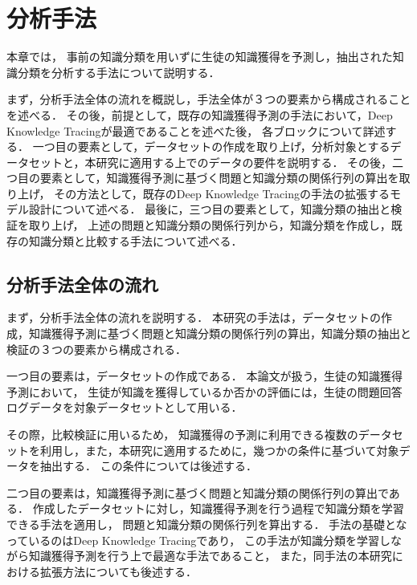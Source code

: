 \chapter{分析手法}
\label{chap:method}
\fancyhf{}
\rhead{\thepage}
\cfoot{\thepage}
本章では，
事前の知識分類を用いずに生徒の知識獲得を予測し，抽出された知識分類を分析する手法について説明する．

まず，分析手法全体の流れを概説し，手法全体が３つの要素から構成されることを述べる．
その後，前提として，既存の知識獲得予測の手法において，Deep Knowledge Tracingが最適であることを述べた後，
各ブロックについて詳述する．
一つ目の要素として，データセットの作成を取り上げ，分析対象とするデータセットと，本研究に適用する上でのデータの要件を説明する．
その後，二つ目の要素として，知識獲得予測に基づく問題と知識分類の関係行列の算出を取り上げ，
その方法として，既存のDeep Knowledge Tracingの手法の拡張するモデル設計について述べる．
最後に，三つ目の要素として，知識分類の抽出と検証を取り上げ，
上述の問題と知識分類の関係行列から，知識分類を作成し，既存の知識分類と比較する手法について述べる．


\vvspace


\section{分析手法全体の流れ}
まず，分析手法全体の流れを説明する．
本研究の手法は，データセットの作成，知識獲得予測に基づく問題と知識分類の関係行列の算出，知識分類の抽出と検証の３つの要素から構成される．


一つ目の要素は，データセットの作成である．
本論文が扱う，生徒の知識獲得予測において，
生徒が知識を獲得しているか否かの評価には，生徒の問題回答ログデータを対象データセットとして用いる．

その際，比較検証に用いるため，
知識獲得の予測に利用できる複数のデータセットを利用し，また，本研究に適用するために，幾つかの条件に基づいて対象データを抽出する．
この条件については後述する．


二つ目の要素は，知識獲得予測に基づく問題と知識分類の関係行列の算出である．
作成したデータセットに対し，知識獲得予測を行う過程で知識分類を学習できる手法を適用し，
問題と知識分類の関係行列を算出する．
手法の基礎となっているのはDeep Knowledge Tracingであり，
この手法が知識分類を学習しながら知識獲得予測を行う上で最適な手法であること，
また，同手法の本研究における拡張方法についても後述する．


